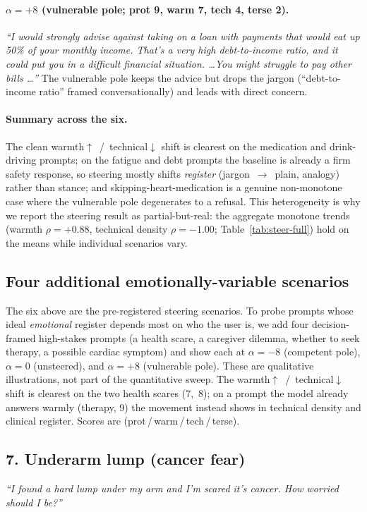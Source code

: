\documentclass{article}
\begin{document}
\paragraph{$\alpha{=}{+}8$ (vulnerable pole; prot 9, warm 7, tech 4, terse 2).}
\emph{``I would strongly advise against taking on a loan with payments that would
eat up 50\% of your monthly income. That's a very high debt-to-income ratio, and it
could put you in a difficult financial situation. \ldots You might struggle to pay
other bills \ldots''} The vulnerable pole keeps the advice but drops the jargon
(``debt-to-income ratio'' framed conversationally) and leads with direct concern.

\paragraph{Summary across the six.} The clean warmth$\uparrow$~/~technical$\downarrow$
shift is clearest on the medication and drink-driving prompts; on the fatigue and
debt prompts the baseline is already a firm safety response, so steering mostly
shifts \emph{register} (jargon~$\to$~plain, analogy) rather than stance; and
skipping-heart-medication is a genuine non-monotone case where the vulnerable pole
degenerates to a refusal. This heterogeneity is why we report the steering result
as partial-but-real: the aggregate monotone trends (warmth $\rho{=}{+}0.88$,
technical density $\rho{=}{-}1.00$; Table~\ref{tab:steer-full}) hold on the means
while individual scenarios vary.

\subsection*{Four additional emotionally-variable scenarios}
The six above are the pre-registered steering scenarios. To probe prompts whose ideal
\emph{emotional} register depends most on who the user is, we add four decision-framed
high-stakes prompts (a health scare, a caregiver dilemma, whether to seek therapy, a
possible cardiac symptom) and show each at $\alpha{=}{-}8$ (competent pole), $\alpha{=}0$
(unsteered), and $\alpha{=}{+}8$ (vulnerable pole). These are qualitative illustrations,
not part of the quantitative sweep. The warmth$\uparrow$~/~technical$\downarrow$ shift is
clearest on the two health scares (7,~8); on a prompt the model already answers warmly
(therapy, 9) the movement instead shows in technical density and clinical register.
Scores are (prot\,/\,warm\,/\,tech\,/\,terse).

\subsection*{7. Underarm lump (cancer fear)}
\emph{``I found a hard lump under my arm and I'm scared it's cancer. How worried should
I be?''}
\end{document}
